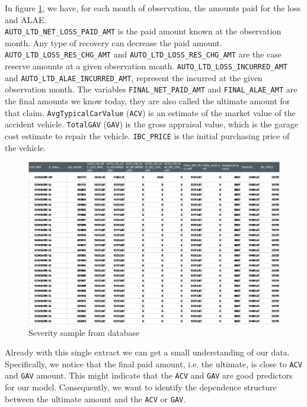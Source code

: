 	In figure \ref{Fig_sample_2}, we have, for each month of observation, the amounts paid for the loss and ALAE.\\
	\texttt{AUTO\_LTD\_NET\_LOSS\_PAID\_AMT} is the paid amount known at the observation month. Any type of recovery can decrease the paid amount. \texttt{AUTO\_LTD\_LOSS\_RES\_CHG\_AMT} and \texttt{AUTO\_LTD\_LOSS\_RES\_CHG\_AMT} are the case reserve amounts at a given observation month. \texttt{AUTO\_LTD\_LOSS\_INCURRED\_AMT} and \texttt{AUTO\_LTD\_ALAE\_INCURRED\_AMT}, represent the incurred at the given observation month. The variables \texttt{FINAL\_NET\_PAID\_AMT} and \texttt{FINAL\_ALAE\_AMT} are the final amounts we know today, they are also called the ultimate amount for that claim. \texttt{AvgTypicalCarValue} (\texttt{ACV}) is an estimate of the market value of the accident vehicle. \texttt{TotalGAV} (\texttt{GAV}) is the gross appraisal value, which is the garage cost estimate to repair the vehicle. \texttt{IBC\_PRICE} is the initial purchasing price of the vehicle.\\
	\begin{figure}[H]
		\begin{center}
			\includegraphics[scale=0.6]{Graphiques/sample_2} 
			\renewcommand{\figurename}{Figure}
			\caption{Severity sample from database}\label{Fig_sample_2}
		\end{center}
	\end{figure}

	Already with this single extract we can get a small understanding of our data. Specifically, we notice that the final paid amount, i.e. the ultimate, is close to \texttt{ACV} and \texttt{GAV} amount. This might indicate that the \texttt{ACV} and \texttt{GAV} are good predictors for our model. Consequently, we want to identify the dependence structure between the ultimate amount and the \texttt{ACV} or \texttt{GAV}. \\
	
